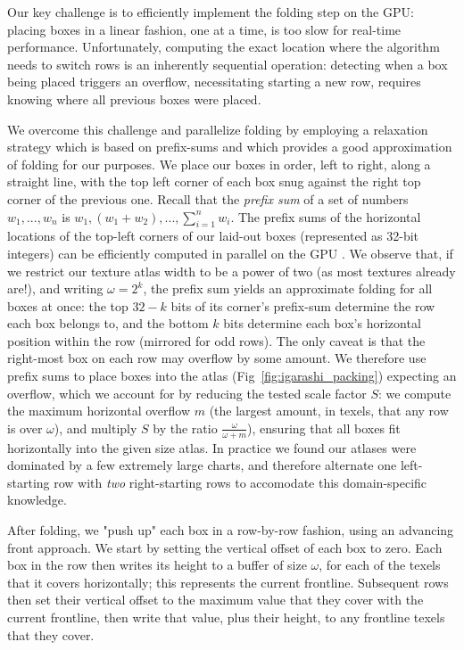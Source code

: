 Our key challenge is to efficiently implement the folding step on the GPU: placing boxes in a linear fashion, one at a time, is too slow for real-time performance. Unfortunately, computing the exact location where the algorithm needs to switch rows is an inherently sequential operation: detecting when a box being placed triggers an overflow, necessitating starting a new row, requires knowing where all previous boxes were placed. 

We overcome this challenge and parallelize folding by employing a relaxation strategy which is based on prefix-sums and which provides a good approximation of folding for our purposes. We place our boxes in order, left to right, along a straight line, with the top left corner of each box snug against the right top corner of the previous one.  
Recall that the {\em prefix sum} of a set of numbers $w_1,...,w_n$ is $w_1,(w_1+w_2),...,\sum_{i=1}^{n}  {w_i}$. The prefix sums of the horizontal locations of the top-left corners of our laid-out boxes (represented as 32-bit integers) can be efficiently computed in parallel on the GPU \cite{harris2007parallel}. We observe that, if we restrict our texture atlas width to be a power of two (as most textures already are!), and writing $\omega=2^k$, the prefix sum yields an approximate folding for all boxes at once: the top $32-k$ bits of its corner's prefix-sum determine the row each box belongs to, and the bottom $k$ bits determine each box's horizontal position within the row (mirrored for odd rows). The only caveat is that the right-most box on each row may overflow by some amount. We therefore use prefix sums to place boxes into the atlas (Fig~\ref{fig:igarashi_packing}) expecting an overflow, which we account for by reducing the tested scale factor $S$: we compute the maximum horizontal overflow $m$ (the largest amount, in texels, that any row is over $\omega$), and multiply $S$ by the ratio $\frac{\omega}{\omega + m}$), ensuring that all boxes fit horizontally into the given size atlas. In practice we found our atlases were dominated by a few extremely large charts, and therefore alternate one left-starting row with {\em two} right-starting rows to accomodate this domain-specific knowledge.
 
After folding, we "push up" each box in a row-by-row fashion, using an advancing front approach. We start by setting the vertical offset of each box to zero. Each box in the row then writes its height to a buffer of size $\omega$, for each of the texels that it covers horizontally; this represents the current frontline. Subsequent rows then set their vertical offset to the maximum value that they cover with the current frontline, then write that value, plus their height, to any frontline texels that they cover. 
